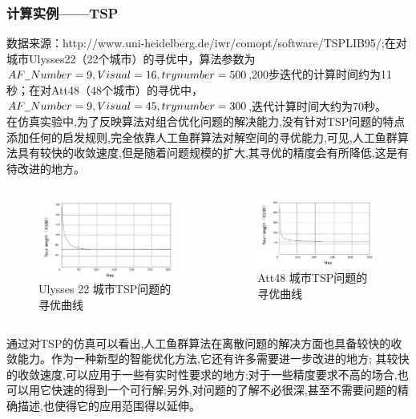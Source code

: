 \begin{frame}
\frametitle{计算实例——TSP}
\small{数据来源：http://www.uni-heidelberg.de/iwr/comopt/software/TSPLIB95/;在对城市Ulysses22（22个城市）的寻优中，算法参数为$AF\underline{\hspace{0.5em}}Number=9, Visual=16,trynumber=500$,200步迭代的计算时间约为11秒；在对Att48（48个城市）的寻优中，$AF\underline{\hspace{0.5em}}Number=9, Visual=45, trynumber=300$,迭代计算时间大约为70秒。\\
在仿真实验中,为了反映算法对组合优化问题的解决能力,没有针对TSP问题的特点添加任何的启发规则,完全依靠人工鱼群算法对解空间的寻优能力,可见,人工鱼群算法具有较快的收敛速度,但是随着问题规模的扩大,其寻优的精度会有所降低,这是有待改进的地方。}
\begin{columns}
	\begin{figure}
	\centering
	\includegraphics[width=1.0\textwidth]{pic/fish4.png}
	\caption{Ulysses 22 城市TSP问题的寻优曲线}
	\end{figure}
	\begin{figure}
	\centering
	\includegraphics[width=1.0\textwidth]{pic/fish5.png}
	\caption{Att48 城市TSP问题的寻优曲线}
	\end{figure}

\end{columns}
通过对TSP的仿真可以看出,人工鱼群算法在离散问题的解决方面也具备较快的收敛能力。作为一种新型的智能优化方法,它还有许多需要进一步改进的地方;
其较快的收敛速度,可以应用于一些有实时性要求的地方;对于一些精度要求不高的场合,也可以用它快速的得到一个可行解;另外,对问题的了解不必很深,甚至不需要问题的精确描述,也使得它的应用范围得以延伸。
\end{frame}

